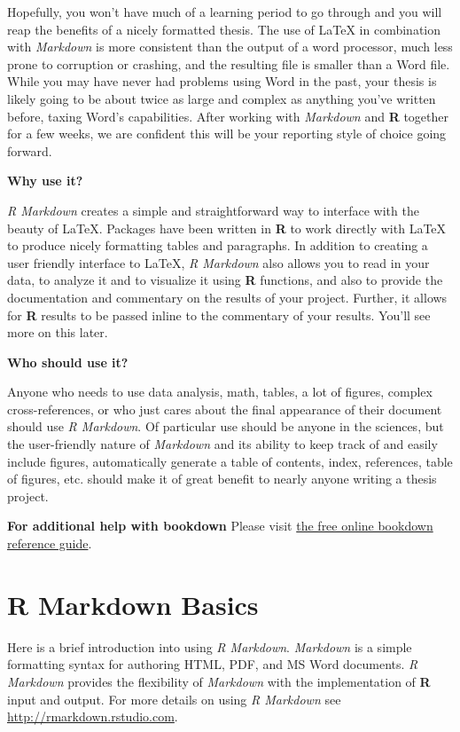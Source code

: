 \documentclass[12pt,twoside]{reedthesis}
\begin{document}
Hopefully, you won't have much of a learning period to go through and you will reap the benefits of a nicely formatted thesis. The use of LaTeX in combination with \emph{Markdown} is more consistent than the output of a word processor, much less prone to corruption or crashing, and the resulting file is smaller than a Word file. While you may have never had problems using Word in the past, your thesis is likely going to be about twice as large and complex as anything you've written before, taxing Word's capabilities. After working with \emph{Markdown} and \textbf{R} together for a few weeks, we are confident this will be your reporting style of choice going forward.

\textbf{Why use it?}

\emph{R Markdown} creates a simple and straightforward way to interface with the beauty of LaTeX. Packages have been written in \textbf{R} to work directly with LaTeX to produce nicely formatting tables and paragraphs. In addition to creating a user friendly interface to LaTeX, \emph{R Markdown} also allows you to read in your data, to analyze it and to visualize it using \textbf{R} functions, and also to provide the documentation and commentary on the results of your project. Further, it allows for \textbf{R} results to be passed inline to the commentary of your results. You'll see more on this later.

\textbf{Who should use it?}

Anyone who needs to use data analysis, math, tables, a lot of figures, complex cross-references, or who just cares about the final appearance of their document should use \emph{R Markdown}. Of particular use should be anyone in the sciences, but the user-friendly nature of \emph{Markdown} and its ability to keep track of and easily include figures, automatically generate a table of contents, index, references, table of figures, etc. should make it of great benefit to nearly anyone writing a thesis project.

\textbf{For additional help with bookdown}
Please visit \href{https://bookdown.org/yihui/bookdown/}{the free online bookdown reference guide}.

\hypertarget{rmd-basics}{%
\chapter{R Markdown Basics}\label{rmd-basics}}

Here is a brief introduction into using \emph{R Markdown}. \emph{Markdown} is a simple formatting syntax for authoring HTML, PDF, and MS Word documents. \emph{R Markdown} provides the flexibility of \emph{Markdown} with the implementation of \textbf{R} input and output. For more details on using \emph{R Markdown} see \url{http://rmarkdown.rstudio.com}.
\end{document}
